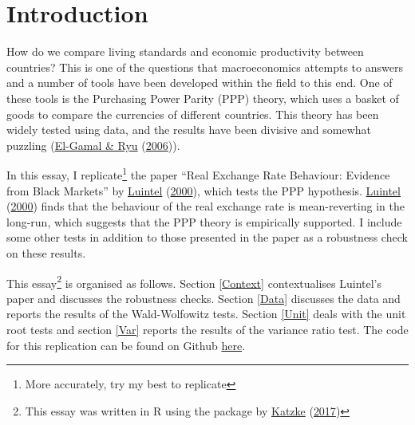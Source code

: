 \documentclass[11pt,preprint, authoryear]{elsarticle}
\numberwithin{equation}{section}
\numberwithin{figure}{section}
\numberwithin{table}{section}
\let\rmarkdownfootnote\footnote%
\def\footnote{\protect\rmarkdownfootnote}
\begin{document}
\renewcommand{\contentsname}{Table of Contents}
{\tableofcontents}

\pagestyle{fancy}
\chead{}
\rhead{}
\lfoot{}
\lhead{}
\cfoot{}


\headsep 35pt %




\newpage

\hypertarget{introduction}{%
\section{\texorpdfstring{Introduction
\label{Introduction}}{Introduction }}\label{introduction}}

How do we compare living standards and economic productivity between
countries? This is one of the questions that macroeconomics attempts to
answers and a number of tools have been developed within the field to
this end. One of these tools is the Purchasing Power Parity (PPP)
theory, which uses a basket of goods to compare the currencies of
different countries. This theory has been widely tested using data, and
the results have been divisive and somewhat puzzling
(\protect\hyperlink{ref-puz}{El-Gamal \& Ryu}
(\protect\hyperlink{ref-puz}{2006})).

In this essay, I replicate\footnote{More accurately, try my best to
  replicate} the paper ``Real Exchange Rate Behaviour: Evidence from
Black Markets'' by \protect\hyperlink{ref-Kul}{Luintel}
(\protect\hyperlink{ref-Kul}{2000}), which tests the PPP hypothesis.
\protect\hyperlink{ref-Kul}{Luintel} (\protect\hyperlink{ref-Kul}{2000})
finds that the behaviour of the real exchange rate is mean-reverting in
the long-run, which suggests that the PPP theory is empirically
supported. I include some other tests in addition to those presented in
the paper as a robustness check on these results.

This essay\footnote{This essay was written in R using the package by
  \protect\hyperlink{ref-Texevier}{Katzke}
  (\protect\hyperlink{ref-Texevier}{2017})} is organised as follows.
Section \ref{Context} contextualises Luintel's paper and discusses the
robustness checks. Section \ref{Data} discusses the data and reports the
results of the Wald-Wolfowitz tests. Section \ref{Unit} deals with the
unit root tests and section \ref{Var} reports the results of the
variance ratio test. The code for this replication can be found on
Github \href{https://github.com/cass-code/metrics.git}{here}.
\end{document}
